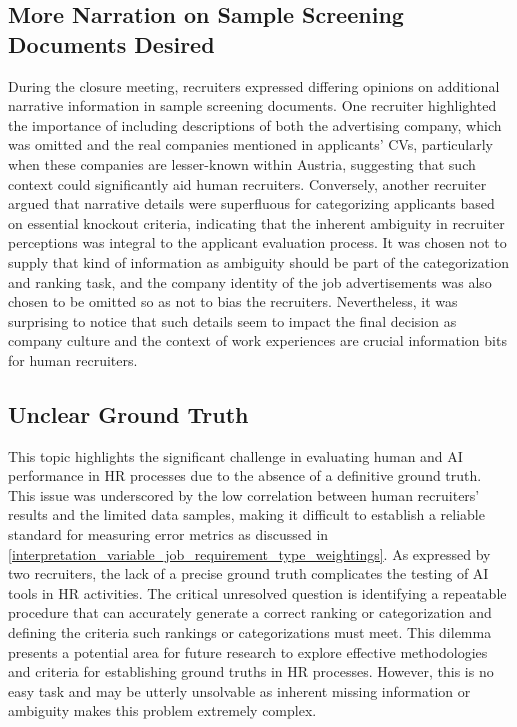 \documentclass[draft,final]{thesisclass} %
\begin{document}
\subsection{More Narration on Sample Screening Documents Desired}
During the closure meeting, recruiters expressed differing opinions on additional narrative information in sample screening documents. One recruiter highlighted the importance of including descriptions of both the advertising company, which was omitted and the real companies mentioned in applicants' \acs{CV}s, particularly when these companies are lesser-known within Austria, suggesting that such context could significantly aid human recruiters. Conversely, another recruiter argued that narrative details were superfluous for categorizing applicants based on essential knockout criteria, indicating that the inherent ambiguity in recruiter perceptions was integral to the applicant evaluation process. It was chosen not to supply that kind of information as ambiguity should be part of the categorization and ranking task, and the company identity of the job advertisements was also chosen to be omitted so as not to bias the recruiters. Nevertheless, it was surprising to notice that such details seem to impact the final decision as company culture and the context of work experiences are crucial information bits for human recruiters.

\subsection{Unclear Ground Truth}
This topic highlights the significant challenge in evaluating human and \acs{AI} performance in \acs{HR} processes due to the absence of a definitive ground truth. This issue was underscored by the low correlation between human recruiters' results and the limited data samples, making it difficult to establish a reliable standard for measuring error metrics as discussed in \ref{interpretation_variable_job_requirement_type_weightings}. As expressed by two recruiters, the lack of a precise ground truth complicates the testing of \acs{AI} tools in \acs{HR} activities. The critical unresolved question is identifying a repeatable procedure that can accurately generate a correct ranking or categorization and defining the criteria such rankings or categorizations must meet. This dilemma presents a potential area for future research to explore effective methodologies and criteria for establishing ground truths in \acs{HR} processes. However, this is no easy task and may be utterly unsolvable as inherent missing information or ambiguity makes this problem extremely complex.
\end{document}
